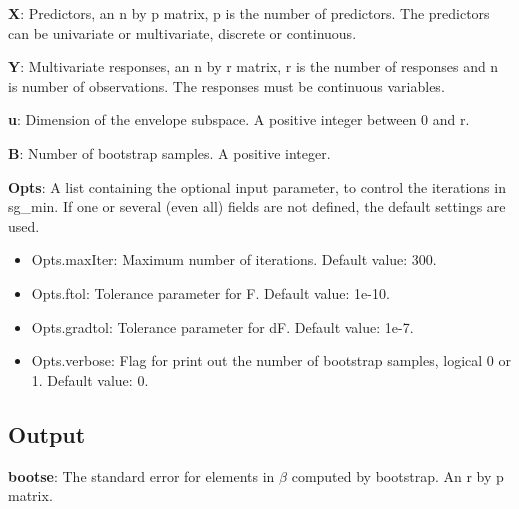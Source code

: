 \documentclass[a4paper,11pt,openany]{memoir}
\begin{document}
\begin{par}
\textbf{X}: Predictors, an n by p matrix, p is the number of predictors.  The predictors can be univariate or multivariate, discrete or continuous.
\end{par} \vspace{1em}
\begin{par}
\textbf{Y}: Multivariate responses, an n by r matrix, r is the number of responses and n is number of observations.  The responses must be continuous variables.
\end{par} \vspace{1em}
\begin{par}
\textbf{u}: Dimension of the envelope subspace.  A positive integer between 0 and r.
\end{par} \vspace{1em}
\begin{par}
\textbf{B}: Number of bootstrap samples.  A positive integer.
\end{par} \vspace{1em}
\begin{par}
\textbf{Opts}: A list containing the optional input parameter, to control the iterations in sg\_min. If one or several (even all) fields are not defined, the default settings are used.
\end{par} \vspace{1em}
\begin{itemize}
\setlength{\itemsep}{-1ex}
   \item Opts.maxIter: Maximum number of iterations.  Default value: 300.
   \item Opts.ftol: Tolerance parameter for F.  Default value: 1e-10.
   \item Opts.gradtol: Tolerance parameter for dF.  Default value: 1e-7.
   \item Opts.verbose: Flag for print out the number of bootstrap samples, logical 0 or 1. Default value: 0.
\end{itemize}


\subsection*{Output}

\begin{par}
\textbf{bootse}: The standard error for elements in $\beta$ computed by bootstrap.  An r by p matrix.
\end{par} \vspace{1em}
\end{document}
